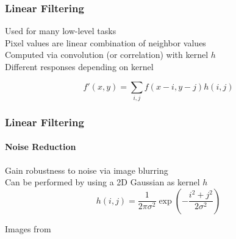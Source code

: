 \documentclass[xetex,professionalfont]{beamer}
\renewcommand\emph[1]{\textcolor{tuwcvl_inf_red}{#1}}
\begin{document}

\begin{frame}
\frametitle{Linear Filtering}

Used for many low-level tasks\\\medskip
Pixel values are linear combination of neighbor values\\\medskip
Computed via \emph{convolution} (or correlation) with \emph{kernel} $h$ \\\medskip
Different responses depending on kernel

\bigskip
\[
f'(x,y) = \sum_{i,j}f(x-i,y-j)h(i,j) %
\]

\end{frame}


\begin{frame}
\frametitle{Linear Filtering}
\framesubtitle{Noise Reduction}

Gain robustness to noise via image blurring\\\medskip
Can be performed by using a 2D Gaussian as kernel $h$ %
\[
h(i,j)=\frac{1}{2\pi\sigma^2}\exp\left(-\frac{i^2+j^2}{2\sigma^2}\right)
\]

\begin{center}
    {\centering Images from \cite{prince12}}
\end{center}

\end{frame}

\end{document}
